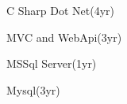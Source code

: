 

\begin{cventries}

  \cventry
  { } %
    { } %
    { } %
    { } %
    {
      \begin{cvitems} %
       {
\item {C Sharp Dot Net(4yr)}
        \item {MVC and WebApi(3yr)}
        \item {MSSql Server(1yr)}
        \item {Mysql(3yr)}
	   }
      \end{cvitems}
    }
      
    
    
    

\end{cventries}
